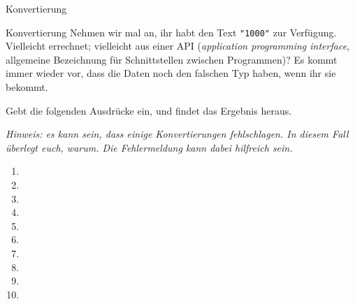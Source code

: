\begin{task}[points=auto]{Konvertierung }
    \begin{subtask*}[points=0]{Konvertierung}
        Nehmen wir mal an, ihr habt den Text {\ttfamily \verb="1000"=} zur Verfügung. Vielleicht
        errechnet; vielleicht aus einer API (\textit{application programming interface}, allgemeine Bezeichnung für Schnittstellen zwischen Programmen)? Es kommt immer wieder vor, dass die Daten noch den falschen Typ haben, wenn ihr sie bekommt.

        Gebt die folgenden Ausdrücke ein, und findet das Ergebnis heraus.

        \textit{Hinweis: es kann sein, dass einige Konvertierungen fehlschlagen. In diesem Fall überlegt euch, warum. Die Fehlermeldung kann dabei hilfreich sein.}

        \begin{multicols}{3}
            \begin{enumerate}
                \item {}
                \item {}
                \item {}
                \item {}
                \item {}
                \item {}
                \item {}
                \item {}
                \item {}
                \item {}
            \end{enumerate}
        \end{multicols}


\end{subtask*}
\end{task}

